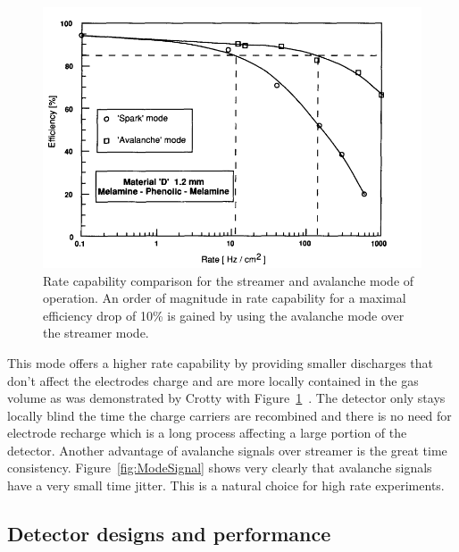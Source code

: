 	\begin{figure}[!h]
		\centering
		\includegraphics[width = \plotwidth]{fig/chapt3/Rate_Mode_Comparison.png}
		\caption{\label{fig:ModeRate} Rate capability comparison for the streamer and avalanche mode of operation. An order of magnitude in rate capability for a maximal efficiency drop of 10\% is gained by using the avalanche mode over the streamer mode.}
	\end{figure}
	
	This mode offers a higher rate capability by providing smaller discharges that don't affect the electrodes charge and are more locally contained in the gas volume as was demonstrated by Crotty with Figure~\ref{fig:ModeRate}~\cite{CROTTY93}. The detector only stays locally blind the time the charge carriers are recombined and there is no need for electrode recharge which is a long process affecting a large portion of the detector. Another advantage of avalanche signals over streamer is the great time consistency. Figure~\ref{fig:ModeSignal} shows very clearly that avalanche signals have a very small time jitter. This is a natural choice for high rate experiments.
	
	\subsection{Detector designs and performance}
	\label{chapt3:ssec:design}
	
